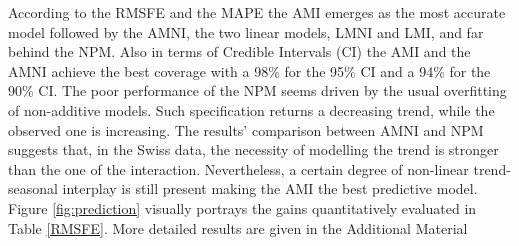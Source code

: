 \documentclass{article}\usepackage[]{graphicx}\usepackage[]{color}
\begin{document}
 
\begin{table} \centering 
\caption{2nd order Fourier models on Swiss Immigration Aggregated Data for Short and Long Run Predictions.} 
\label{RMSFE} 
\end{table}


According to the RMSFE and the MAPE the AMI emerges as the most accurate model followed by the AMNI, the two linear models, LMNI and LMI, and far behind the NPM. Also in terms of Credible Intervals (CI) the AMI and the AMNI achieve the best coverage with a 98\% for the 95\% CI and a 94\% for the 90\% CI. The poor performance of the NPM seems driven by the usual overfitting of non-additive models. Such specification returns a decreasing trend, while the observed one is increasing. The results' comparison between AMNI and NPM suggests that, in the Swiss data, the necessity of modelling the trend is stronger than the one of the interaction. Nevertheless, a certain degree of non-linear trend-seasonal interplay is still present making the AMI the best predictive model. Figure \ref{fig:prediction} visually portrays the gains quantitatively evaluated in Table \ref{RMSFE}. More detailed results are given in the Additional Material \\
\end{document}
